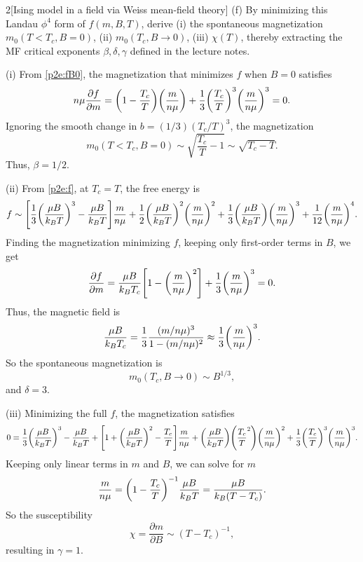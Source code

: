 \documentclass[12pt]{article}
\begin{document}
\begin{problem}{2}[Ising model in a field via Weiss mean-field theory]
(f) By minimizing this Landau $\phi^4$ form of $f(m,B,T)$, derive (i) the
spontaneous magnetization $m_0(T<T_c,B=0)$, (ii) $m_0(T_c,B\to0)$, (iii)
$\chi(T)$, thereby extracting the MF critical exponents $\beta,\delta,\gamma$
defined in the lecture notes.

\begin{solution}
(i) From \eqref{p2e:fB0}, the magnetization that minimizes $f$ when $B=0$
satisfies
\begin{equation}
    n\mu\frac{\partial f}{\partial m}
    =\qty(1-\frac{T_c}{T})\qty(\frac{m}{n\mu})
    +\frac13\qty(\frac{T_c}{T})^3\qty(\frac{m}{n\mu})^3=0.
\end{equation}
Ignoring the smooth change in $b=(1/3)(T_c/T)^3$, the magnetization
\begin{equation}
    m_0(T<T_c,B=0)\sim\sqrt{\frac{T_c}{T}-1}\sim\sqrt{T_c-T}.
\end{equation}
Thus, $\beta=1/2$.

(ii) From \eqref{p2e:f}, at $T_c=T$, the free energy is
\begin{equation}
    f\sim\qty[\frac13\qty(\frac{\mu B}{k_BT})^3-\frac{\mu
    B}{k_BT}]\frac{m}{n\mu}
    +\frac12\qty(\frac{\mu B}{k_BT})^2\qty(\frac{m}{n\mu})^2
    +\frac13\qty(\frac{\mu B}{k_BT})\qty(\frac{m}{n\mu})^3
    +\frac1{12}\qty(\frac{m}{n\mu})^4.
\end{equation}
Finding the magnetization minimizing $f$, keeping only first-order terms in 
$B$, we get
\begin{equation}
    \frac{\partial f}{\partial m}
    =\frac{\mu B}{k_BT_c}\qty[1-\qty(\frac{m}{n\mu})^2]
    +\frac13\qty(\frac{m}{n\mu})^3=0.
\end{equation}
Thus, the magnetic field is
\begin{equation}
    \frac{\mu B}{k_BT_c}
    =\frac13\frac{(m/n\mu)^3}{1-(m/n\mu)^2}
    \approx\frac13\qty(\frac{m}{n\mu})^3.
\end{equation}
So the spontaneous magnetization is
\begin{equation}
    m_0(T_c,B\to0)\sim B^{1/3}, 
\end{equation}
and $\delta=3$.

(iii) Minimizing the full $f$, the magnetization satisfies
\begin{equation}
    0=\frac13\qty(\frac{\mu B}{k_BT})^3-\frac{\mu B}{k_BT}
    +\qty[1+\qty(\frac{\mu B}{k_BT})^2-\frac{T_c}{T}]\frac{m}{n\mu}
    +\qty(\frac{\mu B}{k_BT})\qty(\frac{T_c}{T}^2)\qty(\frac{m}{n\mu})^2
    +\frac13\qty(\frac{T_c}{T})^3\qty(\frac{m}{n\mu})^3.
\end{equation}
Keeping only linear terms in $m$ and $B$, we can solve for $m$
\begin{equation}
    \frac{m}{n\mu}=\qty(1-\frac{T_c}{T})^{-1}\frac{\mu B}{k_BT}
    =\frac{\mu B}{k_B(T-T_c)}.
\end{equation}
So the susceptibility
\begin{equation}
    \chi=\frac{\partial m}{\partial B}
    \sim(T-T_c)^{-1},
\end{equation}
resulting in $\gamma=1$.
\end{solution}


\end{problem}
\end{document}
